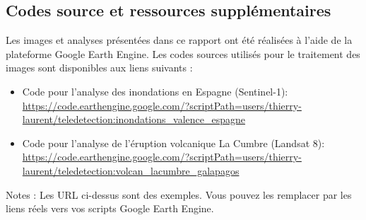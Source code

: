 \documentclass[12pt,a4paper]{article}
\begin{document}
\newpage



\newpage
\subsection*{Codes source et ressources supplémentaires}

Les images et analyses présentées dans ce rapport ont été réalisées à l'aide de la plateforme Google Earth Engine. Les codes sources utilisés pour le traitement des images sont disponibles aux liens suivants :

\begin{itemize}
    \item Code pour l'analyse des inondations en Espagne (Sentinel-1): 
    \url{https://code.earthengine.google.com/?scriptPath=users/thierry-laurent/teledetection:inondations_valence_espagne}
    
    \item Code pour l'analyse de l'éruption volcanique La Cumbre (Landsat 8): 
    \url{https://code.earthengine.google.com/?scriptPath=users/thierry-laurent/teledetection:volcan_lacumbre_galapagos}
\end{itemize}

Notes : Les URL ci-dessus sont des exemples. Vous pouvez les remplacer par les liens réels vers vos scripts Google Earth Engine.
\end{document}
